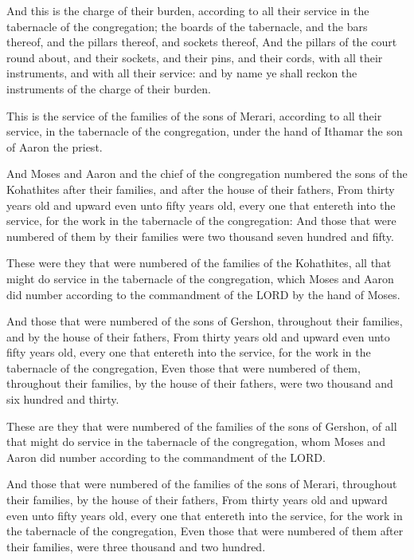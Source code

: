 \Verse And this is the charge of their burden, according to all their
service in the tabernacle of the congregation; the boards of the
tabernacle, and the bars thereof, and the pillars thereof, and sockets
thereof, \Verse And the pillars of the court round about, and their
sockets, and their pins, and their cords, with all their instruments,
and with all their service: and by name ye shall reckon the
instruments of the charge of their burden.

\Verse This is the service of the families of the sons of Merari,
according to all their service, in the tabernacle of the congregation,
under the hand of Ithamar the son of Aaron the priest.

\Verse And Moses and Aaron and the chief of the congregation numbered
the sons of the Kohathites after their families, and after the house
of their fathers, \Verse From thirty years old and upward even unto
fifty years old, every one that entereth into the service, for the
work in the tabernacle of the congregation: \Verse And those that were
numbered of them by their families were two thousand seven hundred and
fifty.

\Verse These were they that were numbered of the families of the
Kohathites, all that might do service in the tabernacle of the
congregation, which Moses and Aaron did number according to the
commandment of the LORD by the hand of Moses.

\Verse And those that were numbered of the sons of Gershon, throughout
their families, and by the house of their fathers, \Verse From thirty
years old and upward even unto fifty years old, every one that
entereth into the service, for the work in the tabernacle of the
congregation, \Verse Even those that were numbered of them, throughout
their families, by the house of their fathers, were two thousand and
six hundred and thirty.

\Verse These are they that were numbered of the families of the sons of
Gershon, of all that might do service in the tabernacle of the
congregation, whom Moses and Aaron did number according to the
commandment of the LORD.

\Verse And those that were numbered of the families of the sons of
Merari, throughout their families, by the house of their fathers, \Verse
From thirty years old and upward even unto fifty years old, every one
that entereth into the service, for the work in the tabernacle of the
congregation, \Verse Even those that were numbered of them after their
families, were three thousand and two hundred.

